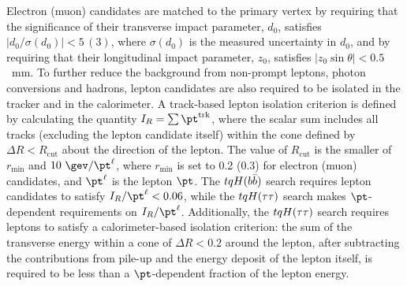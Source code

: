 Electron (muon) candidates are matched to the primary vertex by requiring that the significance of their transverse impact parameter, $d_0$, 
satisfies $|d_0/\sigma(d_0)|<5\,(3)$, where $\sigma(d_0)$ is the measured uncertainty in $d_0$,
and by requiring that their longitudinal impact parameter, $z_0$, satisfies $|z_0 \sin\theta|<0.5$~mm.
To further reduce the background from non-prompt leptons, photon conversions and hadrons, lepton candidates are also required to be isolated 
in the tracker and in the calorimeter.
A track-based lepton isolation criterion is defined by calculating the quantity $I_R = \sum \pt^{\textrm{trk}}$, where
the scalar sum includes all tracks (excluding the lepton candidate itself) within the cone defined by $\Delta R<R_{\textrm{cut}}$ about the %
direction of the lepton.  The value of $R_{\textrm{cut}}$ is the smaller of $r_{\textrm{min}}$ and $10~\gev/\pt^\ell$, where
$r_{\textrm{min}}$ is set to 0.2 (0.3) for electron (muon) candidates, and $\pt^\ell$ is the lepton $\pt$. 
The $tqH(b\bar{b})$ search requires lepton candidates to satisfy $I_R/\pt^\ell < 0.06$, while the $tqH(\tau\tau)$ search 
makes $\pt$-dependent requirements on $I_R/\pt^\ell$. Additionally, the $tqH(\tau\tau)$ search requires leptons to
satisfy a calorimeter-based isolation criterion: the sum of the transverse energy within a cone of
$\Delta R<0.2$ around the lepton, after subtracting the contributions
from pile-up and the energy deposit of the lepton itself, is required to be less than a $\pt$-dependent 
fraction of the lepton energy. 

